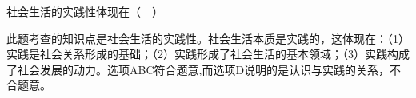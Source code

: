 \question 社会生活的实践性体现在（　）
\par{}
\begin{solution}此题考查的知识点是社会生活的实践性。社会生活本质是实践的，这体现在：（1）实践是社会关系形成的基础；（2）实践形成了社会生活的基本领域；（3）实践构成了社会发展的动力。选项ABC符合题意,而选项D说明的是认识与实践的关系，不合题意。
\end{solution}
